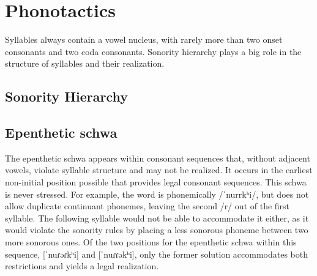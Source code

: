 \section{Phonotactics}

Syllables always contain a vowel nucleus, with rarely more than two onset consonants and two coda consonants. Sonority hierarchy plays a big role in the structure of syllables and their realization.


\subsection{Sonority Hierarchy}


\subsection{Epenthetic schwa}

The epenthetic schwa appears within consonant sequences that, without adjacent vowels, violate syllable structure and may not be realized. It occurs in the earliest non-initial position possible that provides legal consonant sequences. This schwa is never stressed. For example, the word  is phonemically /ˈnurrkʰi/, but \lang{} does not allow duplicate continuant phonemes, leaving the second /r/ out of the first syllable. The following syllable would not be able to accommodate it either, as it would violate the sonority rules by placing a less sonorous phoneme between two more sonorous ones. Of the two positions for the epenthetic schwa within this sequence, [ˈnuɾəɾkʰi] and [ˈnuɾɾəkʰi], only the former solution accommodates both restrictions and yields a legal realization.


